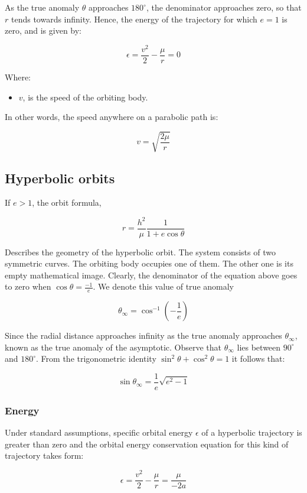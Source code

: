\documentclass[12pt]{article}
\begin{document}
As the true anomaly \(\theta\) approaches \(180^{\circ}\), the denominator
approaches zero, so that \(r\) tends towards infinity. Hence, the energy of the
trajectory for which \(e=1\) is zero, and is given by:

\[\epsilon=\frac{v^2}{2}-\frac{\mu}{r}=0\]

Where:

\begin{itemize}
  \item \(v\), is the speed of the orbiting body.
\end{itemize}

In other words, the speed anywhere on a parabolic path is:

\[v=\sqrt{\frac{2\mu}{r}}\]

\subsection{Hyperbolic orbits}

If \(e>1\), the orbit formula,

\[r=\frac{h^2}{\mu}\frac{1}{1+e\cos\theta}\]

Describes the geometry of the hyperbolic orbit. The system consists of two
symmetric curves. The orbiting body occupies one of them. The other one is its
empty mathematical image. Clearly, the denominator of the equation above goes
to zero when \(\cos\theta=\frac{-1}{e}\). We denote this value of true anomaly

\[\theta_{\infty}=\cos^{-1}\left(-{\frac{1}{e}}\right)\]

Since the radial distance approaches infinity as the true anomaly approaches
\(\theta_{\infty}\), known as the true anomaly of the asymptotic. Observe that
\(\theta_{\infty}\) lies between \(90^{\circ}\) and \(180^{\circ}\). From the
trigonometric identity \(\sin^{2}\theta+\cos^{2}\theta=1\) it follows that:

\[\sin\theta_{\infty}=\frac{1}{e}\sqrt{e^{2}-1}\]

\subsubsection{Energy}

Under standard assumptions, specific orbital energy \(\epsilon\) of a
hyperbolic trajectory is greater than zero and the orbital energy conservation
equation for this kind of trajectory takes form:

\[\epsilon=\frac{v^2}{2}-\frac{\mu}{r}=\frac{\mu}{-2a}\]
\end{document}
